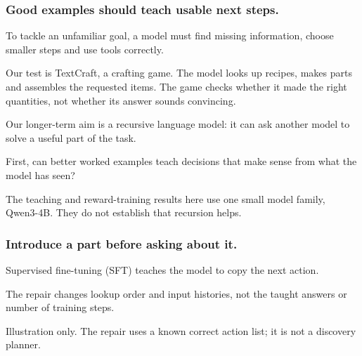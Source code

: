 \documentclass[aspectratio=169,12pt]{beamer}
\newcommand{\aside}[1]{\vfill{\footnotesize\color{Gray}#1\par}}
\begin{document}
\begin{frame}[t]
\frametitle{Good examples should teach usable next steps.}
To tackle an unfamiliar goal, a model must find missing information, choose smaller steps and use tools correctly.
\begin{block}{Our test is TextCraft, a crafting game.}
The model looks up recipes, makes parts and assembles the requested items. The game checks whether it made the right quantities, not whether its answer sounds convincing.
\end{block}
Our longer-term aim is a recursive language model: it can ask another model to solve a useful part of the task.
\medskip

First, can better worked examples teach decisions that make sense from what the model has seen?
\aside{The teaching and reward-training results here use one small model family, Qwen3-4B. They do not establish that recursion helps.}
\end{frame}

\begin{frame}[t]
\frametitle{Introduce a part before asking about it.}
Supervised fine-tuning (SFT) teaches the model to copy the next action.
\vspace{2mm}
\begin{center}
\end{center}
The repair changes lookup order and input histories, not the taught answers or number of training steps.
\aside{Illustration only. The repair uses a known correct action list; it is not a discovery planner.}
\end{frame}
\end{document}
